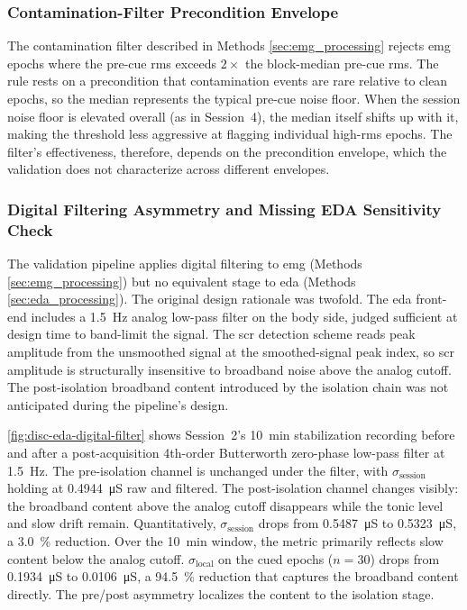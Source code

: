 \subsubsection{Contamination-Filter Precondition Envelope}
\label{sec:disc-lim-filter-envelope}

The contamination filter described in Methods \autoref{sec:emg_processing} rejects \gls{emg} epochs where the pre-cue \gls{rms} exceeds $2 \times$ the block-median pre-cue \gls{rms}. The rule rests on a precondition that contamination events are rare relative to clean epochs, so the median represents the typical pre-cue noise floor. When the session noise floor is elevated overall (as in Session~4), the median itself shifts up with it, making the threshold less aggressive at flagging individual high-\gls{rms} epochs. The filter's effectiveness, therefore, depends on the precondition envelope, which the validation does not characterize across different envelopes.

\subsubsection{Digital Filtering Asymmetry and Missing EDA Sensitivity Check}
\label{sec:disc-lim-eda-filter-sensitivity}

The validation pipeline applies digital filtering to \gls{emg} (Methods \autoref{sec:emg_processing}) but no equivalent stage to \gls{eda} (Methods \autoref{sec:eda_processing}). The original design rationale was twofold. The \gls{eda} front-end includes a \SI{1.5}{\hertz} analog low-pass filter on the body side, judged sufficient at design time to band-limit the signal. The \gls{scr} detection scheme reads peak amplitude from the unsmoothed signal at the smoothed-signal peak index, so \gls{scr} amplitude is structurally insensitive to broadband noise above the analog cutoff. The post-isolation broadband content introduced by the isolation chain was not anticipated during the pipeline's design.

\autoref{fig:disc-eda-digital-filter} shows Session~2's \SI{10}{\minute} stabilization recording before and after a post-acquisition 4th-order Butterworth zero-phase low-pass filter at \SI{1.5}{\hertz}. The pre-isolation channel is unchanged under the filter, with $\sigma_\text{session}$ holding at \SI{0.4944}{\micro\siemens} raw and filtered. The post-isolation channel changes visibly: the broadband content above the analog cutoff disappears while the tonic level and slow drift remain. Quantitatively, $\sigma_\text{session}$ drops from \SI{0.5487}{\micro\siemens} to \SI{0.5323}{\micro\siemens}, a \SI{3.0}{\percent} reduction. Over the \SI{10}{\minute} window, the metric primarily reflects slow content below the analog cutoff. $\sigma_\text{local}$ on the cued epochs ($n = \num{30}$) drops from \SI{0.1934}{\micro\siemens} to \SI{0.0106}{\micro\siemens}, a \SI{94.5}{\percent} reduction that captures the broadband content directly. The pre/post asymmetry localizes the content to the isolation stage.

